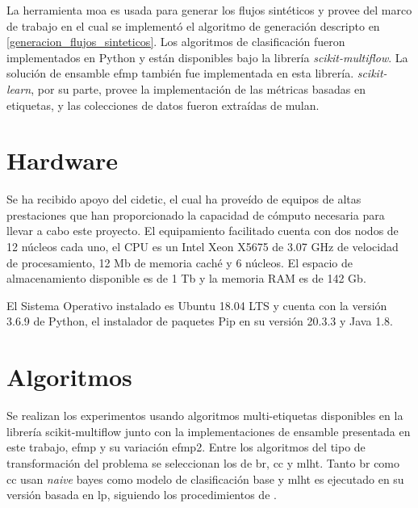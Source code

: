 La herramienta \acrshort{moa} es usada para generar los flujos sintéticos y
provee del marco de trabajo en el cual se implementó el algoritmo de generación
descripto en \ref{generacion_flujos_sinteticos}. Los algoritmos de clasificación
fueron implementados en Python y están disponibles bajo la librería
\textit{scikit-multiflow}. La solución de ensamble \acrshort{efmp} también fue
implementada en esta librería. \textit{scikit-learn}, por su parte, provee la
implementación de las métricas basadas en etiquetas, y las colecciones de datos
fueron extraídas de mulan.

\section{Hardware}

Se ha recibido apoyo del \acrfull{cidetic}, el cual ha proveído de equipos de
altas prestaciones que han proporcionado la capacidad de cómputo necesaria para
llevar a cabo este proyecto. El equipamiento facilitado cuenta con dos nodos de
12 núcleos cada uno, el CPU es un Intel Xeon X5675 de 3.07 GHz de velocidad de
procesamiento, 12 Mb de memoria caché y 6 núcleos. El espacio de almacenamiento
disponible es de 1 Tb y la memoria RAM es de 142 Gb. 

El Sistema Operativo instalado es Ubuntu 18.04 LTS y cuenta con la versión 3.6.9
de Python, el instalador de paquetes Pip en su versión 20.3.3 y Java 1.8.

\section{Algoritmos}
\label{experimentos_algoritmos}

Se realizan los experimentos usando algoritmos multi-etiquetas disponibles en la
librería scikit-multiflow junto con la implementaciones de ensamble presentada
en este trabajo, \acrfull{efmp} y su variación \acrshort{efmp2}. Entre los
algoritmos del tipo de transformación del problema se seleccionan los de
\acrfull{br}, \acrfull{cc} y \acrfull{mlht}. Tanto \acrshort{br} como
\acrshort{cc} usan \textit{naive} bayes como modelo de clasificación base y
\acrshort{mlht} es ejecutado en su versión basada en \acrfull{lp}, siguiendo los
procedimientos de \citeauthor{read_scalable_2012} \cite{read_scalable_2012}.

